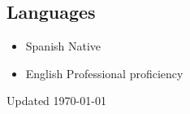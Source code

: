 \documentclass{academiccv}
\begin{document}
\subsection*{Languages}
\begin{itemize}
	\item Spanish \tab Native
	\item English \tab Professional proficiency
\end{itemize}

\begin{center}
\vspace{6em}
Updated \monthyeardate\today
\end{center}
\end{document}
